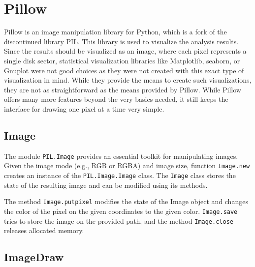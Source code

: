 \documentclass[
  digital, %
  oneside, %
  lof,     %
  lot,     %
]{fithesis4}
\begin{document}
\section{Pillow}

Pillow\cite{pillow} is an image manipulation library for Python, which is a fork of the discontinued library PIL\cite{pil}.
This library is used to visualize the analysis results.
Since the results should be visualized as an image, where each pixel represents a single disk sector, statistical visualization libraries like Matplotlib\cite{matplotlib}, seaborn\cite{waskom21}, or Gnuplot\cite{gnuplot} were not good choices as they were not created with this exact type of visualization in mind.
While they provide the means to create such visualizations, they are not as straightforward as the means provided by Pillow.
While Pillow offers many more features beyond the very basics needed, it still keeps the interface for drawing one pixel at a time very simple. 

\subsection{Image}

The module \texttt{PIL.Image} provides an essential toolkit for manipulating images.
Given the image mode (e.g., RGB or RGBA) and image size, function \texttt{Image.new} creates an instance of the \texttt{PIL.Image.Image} class.
The \texttt{Image} class stores the state of the resulting image and can be modified using its methods. 

The method \texttt{Image.putpixel} modifies the state of the Image object and changes the color of the pixel on the given coordinates to the given color.
\texttt{Image.save} tries to store the image on the provided path, and the method \texttt{Image.close} releases allocated memory. \cite{pillowimage}

\subsection{ImageDraw}
\end{document}
